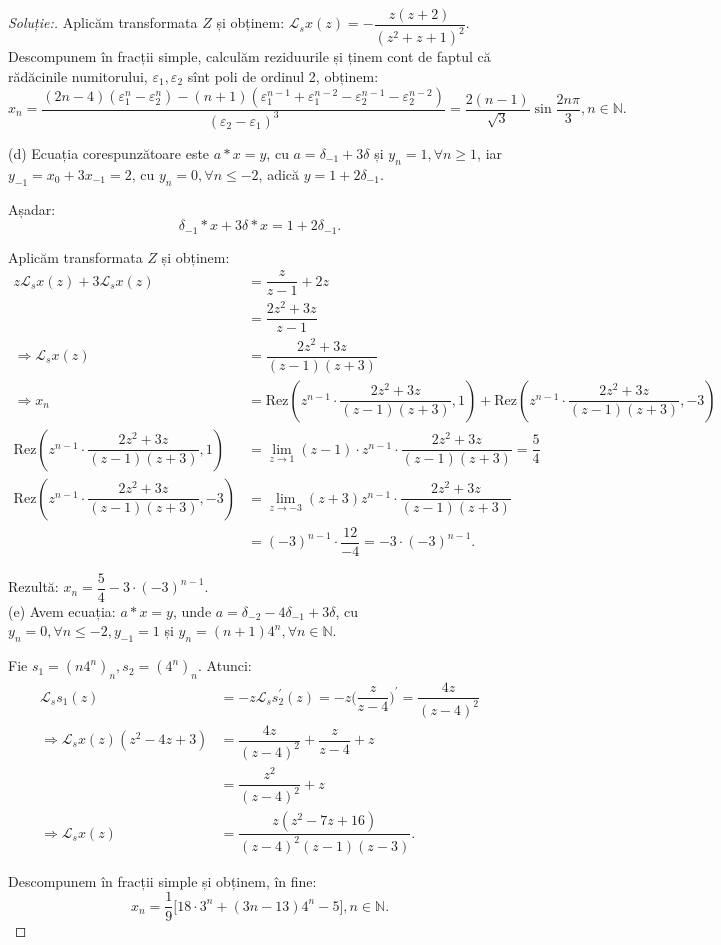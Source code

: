 \documentclass[12pt,a4paper]{article}
\newcommand\Lap{\mathcal{L}}
\newcommand\Rez{\mathrm{Rez}}
\theoremstyle{dotless}
\theoremstyle{dotlessdr}
\newenvironment{solution}
{\begin{proof}[Soluție:\nopunct]}
  {\end{proof}}
\begin{document}
\begin{solution}
Aplicăm transformata $Z$ și obținem: 
$\Lap_s x(z) = - \dfrac{z(z+2)}{(z^2 + z + 1)^2}$. Descompunem în fracții 
simple, calculăm reziduurile și ținem cont de faptul că rădăcinile numitorului, 
$\varepsilon_1, \varepsilon_2$ sînt poli de ordinul 2, obținem: 
\[
x_n = \dfrac{(2n-4)(\varepsilon_1^n - \varepsilon_2^n) - 
(n+1)(\varepsilon_1^{n-1} + \varepsilon_1^{n-2} - \varepsilon_2^{n-1} - 
\varepsilon_2^{n-2})}{(\varepsilon_2 - \varepsilon_1)^3} 
= \dfrac{2(n-1)}{\sqrt{3}} \sin \dfrac{2 n \pi}{3}, n \in \mathbb{N}.
\]

(d) Ecuația corespunzătoare este $a \ast x = y$, cu $a = \delta_{-1} + 3 \delta$ și 
$y_n = 1, \forall n \geq 1$, iar $y_{-1} = x_0 + 3 x_{-1} = 2$, cu 
$y_n = 0, \forall n \leq -2$, adică $y = 1 + 2 \delta_{-1}$.

Așadar: 
\[
\delta_{-1} \ast x + 3 \delta \ast x = 1 + 2 \delta_{-1}.
\]

Aplicăm transformata $Z$ și obținem:
\begin{align*}
z \Lap_s x(z) + 3 \Lap_s x(z) &= \dfrac{z}{z-1} + 2z \\
                              &= \dfrac{2z^2 + 3z}{z-1} \\
\Longrightarrow \Lap_s x(z) &= \dfrac{2z^2 + 3z}{(z-1)(z+3)} \\
\Longrightarrow x_n &= \Rez(z^{n-1} \cdot \dfrac{2z^2 + 3z}{(z-1)(z+3)}, 1) + 
\Rez (z^{n-1} \cdot \dfrac{2z^2 + 3z}{(z-1)(z+3)}, -3) \\
\Rez(z^{n-1} \cdot \dfrac{2z^2 + 3z}{(z-1)(z+3)}, 1) &= \lim_{z \to 1} (z-1) 
\cdot z^{n-1} \cdot \dfrac{2z^2 + 3z}{(z-1)(z+3)} = \dfrac{5}{4} \\
\Rez(z^{n-1} \cdot \dfrac{2z^2 + 3z}{(z-1)(z+3)}, -3) 
&= \lim_{z \to -3} (z+3) z^{n-1} \cdot \dfrac{2z^2 + 3z}{(z-1)(z+3)} \\
&= (-3)^{n-1} \cdot \dfrac{12}{-4} = -3 \cdot (-3)^{n-1}.	                              
\end{align*}

Rezultă: $x_n = \dfrac{5}{4} - 3 \cdot (-3)^{n-1}$. \\

(e) Avem ecuația: $a \ast x = y$, unde 
$a = \delta_{-2} - 4 \delta_{-1} + 3 \delta$, cu 
$y_n = 0, \forall n \leq -2, y_{-1} = 1$ și 
$y_n = (n+1)4^n, \forall n \in \mathbb{N}$.

Fie $s_1 = (n4^n)_n, s_2 = (4^n)_n$. Atunci:
\begin{align*}
\Lap_s s_1(z) &= -z \Lap_s s_2^{\prime}(z) 
= - z \big( \dfrac{z}{z-4} \big)^{\prime} = \dfrac{4z}{(z-4)^2} \\
\Longrightarrow \Lap_s x(z)(z^2 - 4z + 3) 
&= \dfrac{4z}{(z-4)^2} + \dfrac{z}{z-4} + z \\
&= \dfrac{z^2}{(z-4)^2} + z \\
\Longrightarrow  \Lap_s x(z) &= \dfrac{z(z^2 - 7z + 16)}{(z-4)^2 (z-1) (z-3)}.
\end{align*}

Descompunem în fracții simple și obținem, în fine: 
\[
x_n = \dfrac{1}{9} \big[ 18 \cdot 3^n + (3n - 13) 4^n - 5 \big], 
n \in \mathbb{N}.
\]
\end{solution}
\end{document}
